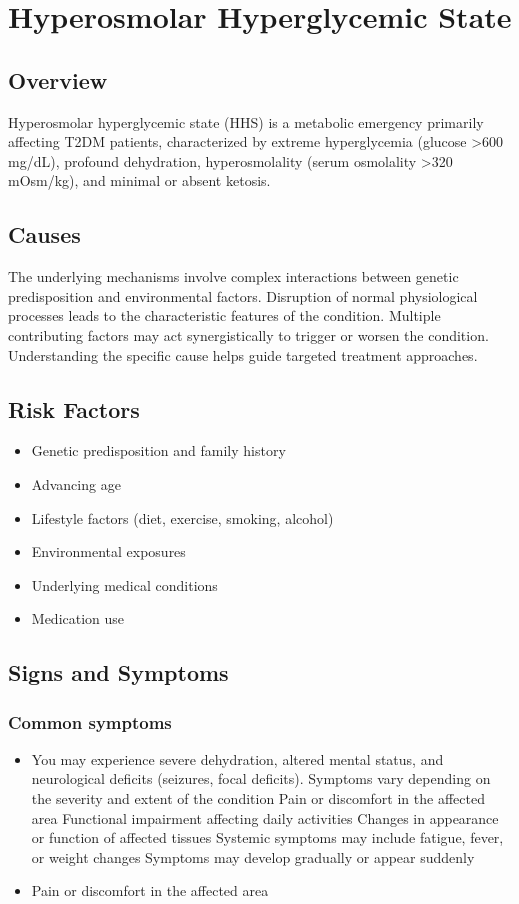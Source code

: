 \chapter{Hyperosmolar Hyperglycemic State}
\label{sec:Hyperosmolar Hyperglycemic State}

\section{Overview}
Hyperosmolar hyperglycemic state (HHS) is a metabolic emergency primarily affecting T2DM patients, characterized by extreme hyperglycemia (glucose >600 mg/dL), profound dehydration, hyperosmolality (serum osmolality >320 mOsm/kg), and minimal or absent ketosis.
\section{Causes}
The underlying mechanisms involve complex interactions between genetic predisposition and environmental factors. Disruption of normal physiological processes leads to the characteristic features of the condition. Multiple contributing factors may act synergistically to trigger or worsen the condition. Understanding the specific cause helps guide targeted treatment approaches.
\section{Risk Factors}


\begin{itemize}[noitemsep]
  \item Genetic predisposition and family history
  \item Advancing age
  \item Lifestyle factors (diet, exercise, smoking, alcohol)
  \item Environmental exposures
  \item Underlying medical conditions
  \item Medication use
\end{itemize}
\section{Signs and Symptoms}

\subsection{Common symptoms}
\begin{itemize}[noitemsep]
  \item You may experience severe dehydration, altered mental status, and neurological deficits (seizures, focal deficits). Symptoms vary depending on the severity and extent of the condition Pain or discomfort in the affected area Functional impairment affecting daily activities Changes in appearance or function of affected tissues Systemic symptoms may include fatigue, fever, or weight changes Symptoms may develop gradually or appear suddenly
  \item Pain or discomfort in the affected area
  \end{itemize}

